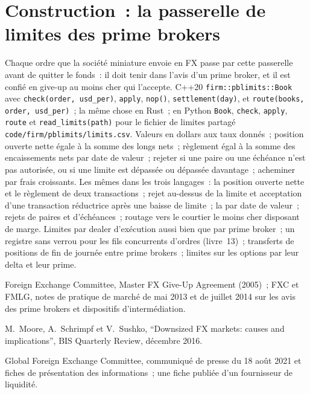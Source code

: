 \section{Construction~: la passerelle de limites des prime brokers}\label{bld:m2:getting-access-fx:pblimits}

\begin{build}
 Chaque ordre que la société miniature envoie en FX passe par cette passerelle avant
de quitter le fonds~: il doit tenir dans l'avis d'un prime broker, et il est confié en give-up au
moins cher qui l'accepte.
 C++20 \texttt{firm::pblimits::Book} avec \texttt{check(order,
usd\_per)}, \texttt{apply}, \texttt{nop()}, \texttt{settlement(day)}, et
\texttt{route(books, order, usd\_per)}~; la même chose en Rust~; en Python \texttt{Book},
\texttt{check}, \texttt{apply}, \texttt{route} et \texttt{read\_limits(path)} pour le
fichier de limites partagé \texttt{code/firm/pblimits/limits.csv}.
 Valeurs en dollars aux taux donnés~; position ouverte nette égale à la somme des longs nets~;
règlement égal à la somme des encaissements nets par date de valeur~; rejeter si une paire ou une échéance n'est pas
autorisée, ou si une limite est dépassée ou dépassée davantage~; acheminer par frais croissants.
 Les mêmes dans les trois langages~: la position ouverte nette et
le règlement de deux transactions~; rejet au-dessus de la limite et acceptation d'une transaction réductrice
après une baisse de limite~; la  par date de valeur~; rejets de paires et d'échéances~; routage
vers le courtier le moins cher disposant de marge.
 Limites par dealer d'exécution aussi bien que par prime broker~; un
registre sans verrou pour les fils concurrents d'ordres (livre~13)~; transferts de
positions de fin de journée entre prime brokers~; limites sur les options par leur delta et leur prime.
\end{build}

\begin{omsources}
\item Foreign Exchange Committee, Master FX Give-Up Agreement (2005)~; FXC et FMLG,
notes de pratique de marché de mai 2013 et de juillet 2014 sur les avis des prime brokers et
dispositifs d'intermédiation.
\item M.~Moore, A.~Schrimpf et V.~Sushko, ``Downsized FX markets: causes and
implications'', BIS Quarterly Review, décembre 2016.
\item Global Foreign Exchange Committee, communiqué de presse du 18 août 2021 et
fiches de présentation des informations~; une fiche publiée d'un fournisseur de liquidité.
\end{omsources}

